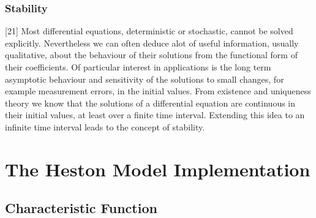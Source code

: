 \documentclass[12pt,twoside]{reedthesis}
\theoremstyle{definition}
\theoremstyle{definition}
\theoremstyle{remark}
\begin{document}
  \subsection{Stability}\label{stability}
  
  {[}21{]} Most differential equations, deterministic or stochastic,
  cannot be solved explicitly. Nevertheless we can often deduce alot of
  useful information, usually qualitative, about the behaviour of their
  solutions from the functional form of their coefficients. Of particular
  interest in applications is the long term asymptotic behaviour and
  sensitivity of the solutions to small changes, for example measurement
  errors, in the initial values. From existence and uniqueness theory we
  know that the solutions of a differential equation are continuous in
  their initial values, at least over a finite time interval. Extending
  this idea to an infinite time interval leads to the concept of
  stability.
  
  \chapter{The Heston Model
  Implementation}\label{the-heston-model-implementation}
  
  \section{Characteristic Function}\label{characteristic-function}
  
\end{document}
